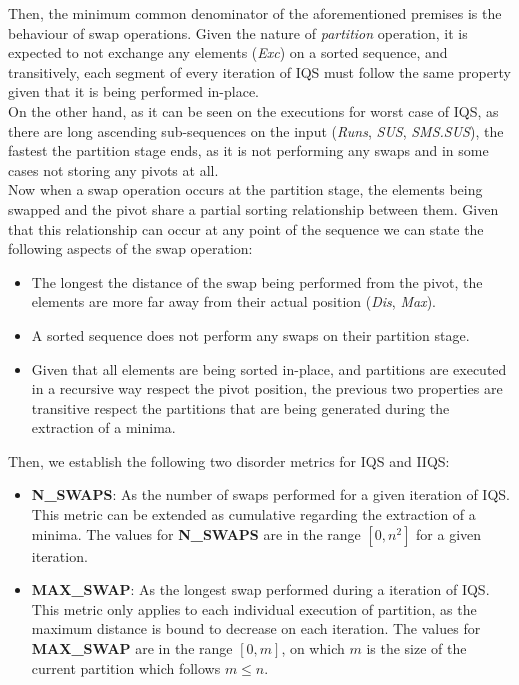 Then, the minimum common denominator of the aforementioned premises is the behaviour of swap operations. Given the nature of \textit{partition} operation, it is expected to not exchange any elements (\textit{Exc}) on a sorted sequence, and transitively, each segment of every iteration of IQS must follow the same property given that it is being performed in-place.\\

On the other hand, as it can be seen on the executions for worst case of IQS, as there are long ascending sub-sequences on the input (\textit{Runs}, \textit{SUS}, \textit{SMS.SUS}), the fastest the partition stage ends, as it is not performing any swaps and in some cases not storing any pivots at all.\\

Now when a swap operation occurs at the partition stage, the elements being swapped and the pivot share a partial sorting relationship between them. Given that this relationship can occur at any point of the sequence we can state the following aspects of the swap operation:\\

\begin{itemize}
    \item The longest the distance of the swap being performed from the pivot, the elements are more far away from their actual position (\textit{Dis}, \textit{Max}).
    \item A sorted sequence does not perform any swaps on their partition stage.
    \item Given that all elements are being sorted in-place, and partitions are executed in a recursive way respect the pivot position, the previous two properties are transitive respect the partitions that are being generated during the extraction of a minima.
\end{itemize}

Then, we establish the following two disorder metrics for IQS and IIQS:\\

\begin{itemize}
    \item \textbf{N\_SWAPS}: As the number of swaps performed for a given iteration of IQS. This metric can be extended as cumulative regarding the extraction of a minima. The values for \textbf{N\_SWAPS} are in the range $[0, n^2]$ for a given iteration.
    \item \textbf{MAX\_SWAP}: As the longest swap performed during a iteration of IQS. This metric only applies to each individual execution of partition, as the maximum distance is bound to decrease on each iteration. The values for \textbf{MAX\_SWAP} are in the range $[0, m]$, on which $m$ is the size of the current partition which follows $m \leq n$.
\end{itemize}

